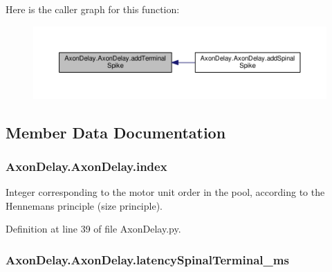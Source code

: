 Here is the caller graph for this function\+:\nopagebreak
\begin{figure}[H]
\begin{center}
\leavevmode
\includegraphics[width=350pt]{class_axon_delay_1_1_axon_delay_a0a75705e6de98e89462381245bb4cb51_icgraph}
\end{center}
\end{figure}




\subsection{Member Data Documentation}
\subsubsection[{\texorpdfstring{index}{index}}]{\setlength{\rightskip}{0pt plus 5cm}Axon\+Delay.\+Axon\+Delay.\+index}\hypertarget{class_axon_delay_1_1_axon_delay_a5dbb9b5002d4b54bf347f48337bdb1c6}{}\label{class_axon_delay_1_1_axon_delay_a5dbb9b5002d4b54bf347f48337bdb1c6}


Integer corresponding to the motor unit order in the pool, according to the Henneman\textquotesingle{}s principle (size principle). 



Definition at line 39 of file Axon\+Delay.\+py.

\subsubsection[{\texorpdfstring{latency\+Spinal\+Terminal\+\_\+ms}{latencySpinalTerminal_ms}}]{\setlength{\rightskip}{0pt plus 5cm}Axon\+Delay.\+Axon\+Delay.\+latency\+Spinal\+Terminal\+\_\+ms}\hypertarget{class_axon_delay_1_1_axon_delay_aaa0b8daf2629cd7fa19d539fe2168d0f}{}\label{class_axon_delay_1_1_axon_delay_aaa0b8daf2629cd7fa19d539fe2168d0f}



